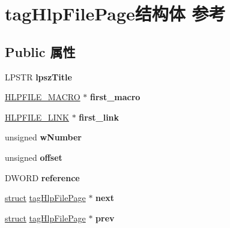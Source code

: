 \hypertarget{structtag_hlp_file_page}{}\section{tag\+Hlp\+File\+Page结构体 参考}
\label{structtag_hlp_file_page}
\subsection*{Public 属性}
\begin{DoxyCompactItemize}
\item 
\mbox{\label{structtag_hlp_file_page_affd0e9aad1aecd3687183366c7f4ac65}} 
L\+P\+S\+TR {\bfseries lpsz\+Title}
\item 
\mbox{\label{structtag_hlp_file_page_a183a594c4f49bc063f3723c5b2a138ff}} 
\hyperlink{structtag_hlp_file_macro}{H\+L\+P\+F\+I\+L\+E\+\_\+\+M\+A\+C\+RO} $\ast$ {\bfseries first\+\_\+macro}
\item 
\mbox{\label{structtag_hlp_file_page_a0dc253a7ffaec907dcde15593a17a2bd}} 
\hyperlink{structtag_hlp_file_link}{H\+L\+P\+F\+I\+L\+E\+\_\+\+L\+I\+NK} $\ast$ {\bfseries first\+\_\+link}
\item 
\mbox{\label{structtag_hlp_file_page_a3d0ab6ffe43a9107a20c1018229de73a}} 
unsigned {\bfseries w\+Number}
\item 
\mbox{\label{structtag_hlp_file_page_a47b541d54aba4e5825e3cd19f2d6e70a}} 
unsigned {\bfseries offset}
\item 
\mbox{\label{structtag_hlp_file_page_a3cdd0ba92c3ece1d412e2dec4c736547}} 
D\+W\+O\+RD {\bfseries reference}
\item 
\mbox{\label{structtag_hlp_file_page_aefba3565163040349fefad3e0042a33e}} 
\hyperlink{interfacestruct}{struct} \hyperlink{structtag_hlp_file_page}{tag\+Hlp\+File\+Page} $\ast$ {\bfseries next}
\item 
\mbox{\label{structtag_hlp_file_page_aef93c88b21cbb986544a6ba3f26aec2e}} 
\hyperlink{interfacestruct}{struct} \hyperlink{structtag_hlp_file_page}{tag\+Hlp\+File\+Page} $\ast$ {\bfseries prev}

\end{DoxyCompactItemize}
